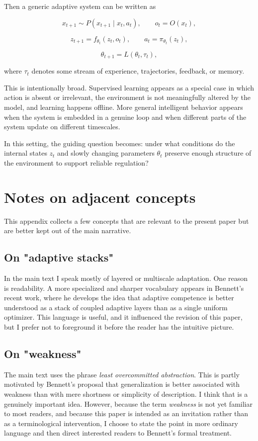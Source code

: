 \documentclass[11pt]{article}
\begin{document}
Then a generic adaptive system can be written as

\[
x_{t+1} \sim P(x_{t+1}\mid x_t, a_t), \qquad o_t = O(x_t),
\]

\[
z_{t+1} = f_{\theta_t}(z_t, o_t), \qquad a_t = \pi_{\theta_t}(z_t),
\]

\[
\theta_{t+1} = L(\theta_t, \tau_t),
\]

where \(\tau_t\) denotes some stream of experience, trajectories, feedback, or memory.

This is intentionally broad. Supervised learning appears as a special case in which action is absent or irrelevant, the environment is not meaningfully altered by the model, and learning happens offline. More general intelligent behavior appears when the system is embedded in a genuine loop and when different parts of the system update on different timescales.

In this setting, the guiding question becomes: under what conditions do the internal states \(z_t\) and slowly changing parameters \(\theta_t\) preserve enough structure of the environment to support reliable regulation?

\section{Notes on adjacent concepts}

This appendix collects a few concepts that are relevant to the present paper but are better kept out of the main narrative.

\subsection{On "adaptive stacks"}

In the main text I speak mostly of layered or multiscale adaptation. One reason is readability. A more specialized and sharper vocabulary appears in Bennett's recent work, where he develops the idea that adaptive competence is better understood as a stack of coupled adaptive layers than as a single uniform optimizer. This language is useful, and it influenced the revision of this paper, but I prefer not to foreground it before the reader has the intuitive picture.

\subsection{On "weakness"}

The main text uses the phrase \textit{least overcommitted abstraction}. This is partly motivated by Bennett's proposal that generalization is better associated with weakness than with mere shortness or simplicity of description. I think that is a genuinely important idea. However, because the term \textit{weakness} is not yet familiar to most readers, and because this paper is intended as an invitation rather than as a terminological intervention, I choose to state the point in more ordinary language and then direct interested readers to Bennett's formal treatment.
\end{document}
